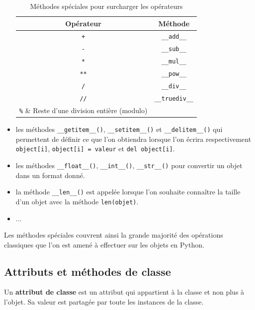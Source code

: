 \documentclass[12pt, a4paper]{article}
\begin{document}
\begin{itemize}
	\begin{table}[H]
	\begin{center}
		\begin{tabular}{|c|c|}
			\hline
			\textbf{Opérateur} & \textbf{Méthode} \\
			\hline
			\lstinline{+} & \lstinline{__add__} \\
			\lstinline{-} & \lstinline{__sub__}\\
			\lstinline{*} & \lstinline{__mul__} \\
			\lstinline{**} & \lstinline{__pow__} \\
			\lstinline{/} & \lstinline{__div__} \\
			\lstinline{//} & \lstinline{__truediv__} \\
			\lstinline{%} & Reste d'une division entière (modulo) \\
			\hline
		\end{tabular}
		\caption{Méthodes spéciales pour surcharger les opérateurs}
		\label{tab:methodes_speciales_operateurs}
	\end{center}
\end{table}

	\item les méthodes \lstinline{__getitem__()}, \lstinline{__setitem__()} et \lstinline{__delitem__()} qui permettent de définir ce que l'on obtiendra lorsque l'on écrira respectivement \lstinline{object[i]}, \lstinline{object[i] = valeur} et \lstinline{del object[i]}.
	
	\item les méthodes \lstinline{__float__()}, \lstinline{__int__()}, \lstinline{__str__()} pour convertir un objet dans un format donné.
	
	\item la méthode \lstinline{__len__()} est appelée lorsque l'on souhaite connaître la taille d'un objet avec la méthode \lstinline{len(objet)}.

	\item ...
\end{itemize}

Les méthodes spéciales couvrent ainsi la grande majorité des opérations classiques que l'on est amené à effectuer sur les objets en Python.

 
\subsection{Attributs et méthodes de classe}
Un \textbf{attribut de classe} est un attribut qui appartient à la classe et non plus à l'objet. Sa valeur est partagée par toute les instances de la classe.
\end{document}
